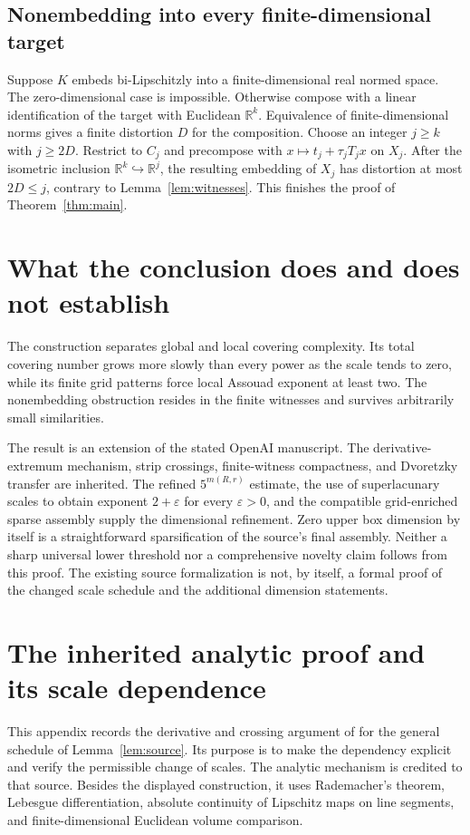 \documentclass[
  11pt,
]{article}
\theoremstyle{remark}\newtheorem{remark}[theorem]{Remark}
\newcommand{\R}{\mathbb R}\newcommand{\N}{\mathbb N}\newcommand{\Z}{\mathbb Z}
\begin{document}
\subsection{Nonembedding into every finite-dimensional target}
Suppose $K$ embeds bi-Lipschitzly into a finite-dimensional real normed space. The zero-dimensional case is impossible. Otherwise compose with a linear identification of the target with Euclidean $\R^k$. Equivalence of finite-dimensional norms gives a finite distortion $D$ for the composition. Choose an integer $j\ge k$ with $j\ge2D$. Restrict to $C_j$ and precompose with $x\mapsto t_j+\tau_jT_jx$ on $X_j$. After the isometric inclusion $\R^k\hookrightarrow\R^j$, the resulting embedding of $X_j$ has distortion at most $2D\le j$, contrary to Lemma~\ref{lem:witnesses}. This finishes the proof of Theorem~\ref{thm:main}.

\section{What the conclusion does and does not establish}
The construction separates global and local covering complexity. Its total covering number grows more slowly than every power as the scale tends to zero, while its finite grid patterns force local Assouad exponent at least two. The nonembedding obstruction resides in the finite witnesses and survives arbitrarily small similarities.

The result is an extension of the stated OpenAI manuscript. The derivative-extremum mechanism, strip crossings, finite-witness compactness, and Dvoretzky transfer are inherited. The refined $5^{m(R,r)}$ estimate, the use of superlacunary scales to obtain exponent $2+\varepsilon$ for every $\varepsilon>0$, and the compatible grid-enriched sparse assembly supply the dimensional refinement. Zero upper box dimension by itself is a straightforward sparsification of the source's final assembly. Neither a sharp universal lower threshold nor a comprehensive novelty claim follows from this proof. The existing source formalization is not, by itself, a formal proof of the changed scale schedule and the additional dimension statements.


\section{The inherited analytic proof and its scale dependence}\label{sec:appendix}
This appendix records the derivative and crossing argument of \cite[Sections 3--5]{OpenAI} for the general schedule of Lemma~\ref{lem:source}. Its purpose is to make the dependency explicit and verify the permissible change of scales. The analytic mechanism is credited to that source. Besides the displayed construction, it uses Rademacher's theorem, Lebesgue differentiation, absolute continuity of Lipschitz maps on line segments, and finite-dimensional Euclidean volume comparison.
\end{document}

